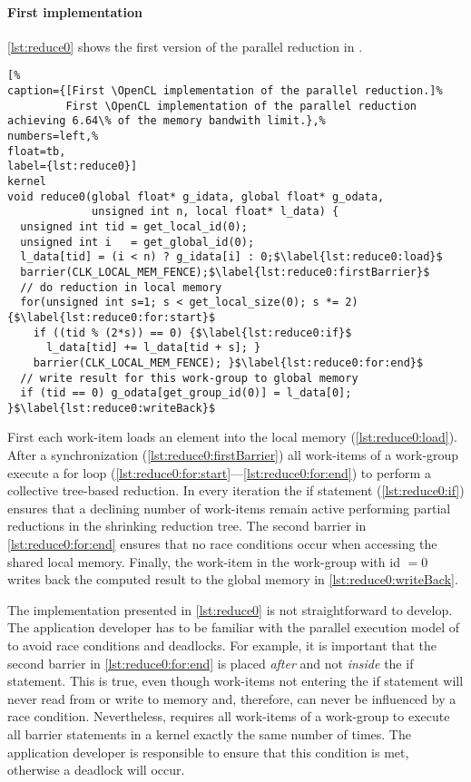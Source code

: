 \newpage

\paragraph{First \OpenCL implementation}
\autoref{lst:reduce0} shows the first version of the parallel reduction in \OpenCL.
%
\begin{lstlisting}[%
caption={[First \OpenCL implementation of the parallel reduction.]%
         First \OpenCL implementation of the parallel reduction achieving 6.64\% of the memory bandwith limit.},%
numbers=left,%
float=tb,
label={lst:reduce0}]
kernel
void reduce0(global float* g_idata, global float* g_odata,
             unsigned int n, local float* l_data) {
  unsigned int tid = get_local_id(0);
  unsigned int i   = get_global_id(0);
  l_data[tid] = (i < n) ? g_idata[i] : 0;$\label{lst:reduce0:load}$
  barrier(CLK_LOCAL_MEM_FENCE);$\label{lst:reduce0:firstBarrier}$
  // do reduction in local memory
  for(unsigned int s=1; s < get_local_size(0); s *= 2) {$\label{lst:reduce0:for:start}$
    if ((tid % (2*s)) == 0) {$\label{lst:reduce0:if}$
      l_data[tid] += l_data[tid + s]; }
    barrier(CLK_LOCAL_MEM_FENCE); }$\label{lst:reduce0:for:end}$
  // write result for this work-group to global memory
  if (tid == 0) g_odata[get_group_id(0)] = l_data[0]; }$\label{lst:reduce0:writeBack}$
\end{lstlisting}
First each work-item loads an element into the local memory (\autoref{lst:reduce0:load}).
After a synchronization (\autoref{lst:reduce0:firstBarrier}) all work-items of a work-group execute a for loop (\autoref{lst:reduce0:for:start}---\autoref{lst:reduce0:for:end}) to perform a collective tree-based reduction.
In every iteration the if statement (\autoref{lst:reduce0:if}) ensures that a declining number of work-items remain active performing partial reductions in the shrinking reduction tree.
The second barrier in \autoref{lst:reduce0:for:end} ensures that no race conditions occur when accessing the shared local memory.
Finally, the work-item in the work-group with id $=0$ writes back the computed result to the global memory in \autoref{lst:reduce0:writeBack}.


The implementation presented in \autoref{lst:reduce0} is not straightforward to develop.
The application developer has to be familiar with the parallel execution model of \OpenCL to avoid race conditions and deadlocks.
For example, it is important that the second barrier in \autoref{lst:reduce0:for:end} is placed \emph{after} and not \emph{inside} the if statement.
This is true, even though work-items not entering the if statement will never read from or write to memory and, therefore, can never be influenced by a race condition.
Nevertheless, \OpenCL requires all work-items of a work-group to execute all barrier statements in a kernel exactly the same number of times.
The application developer is responsible to ensure that this condition is met, otherwise a deadlock will occur.

